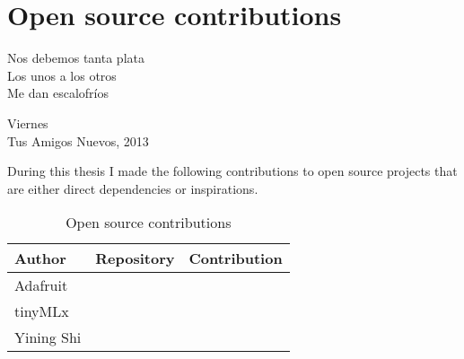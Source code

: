 \chapter{Open source contributions}

\epigraph{Nos debemos tanta plata \\ Los unos a los otros \\ Me dan escalofríos}{Viernes \\ Tus Amigos Nuevos, 2013}

During this thesis I made the following contributions to open source projects that are either direct dependencies or inspirations.

\begin{table}[ht]
    \centering
    \begin{tabular}{ | l | l | l |}
        \hline
        Author & Repository & Contribution \\
        \hline
        Adafruit & \cite[Adafruit{\_}SSD1306]{repository-adafruit-adafruit_ssd1306} & \cite[Format binary numbers]{pull-request-adafruit-adafruit_ssd1306} \\
        \hline
        tinyMLx & \cite[TinyMLx Arduino Library]{repository-tinymlx-arduino-library} & \cite[Update architecture name]{pull-request-tinymlx-arduino-library} \\
        \hline
        Yining Shi & \cite[ML for Physical Computing]{repository-yining1023-machine-learning-for-physical-computing} & \cite[Fixed some typos]{pull-request-yining1023-machine-learning-for-physical-computing} \\
        \hline
    \end{tabular}
    \caption{Open source contributions}
    \label{table:open-source-contributions}
\end{table}{}
